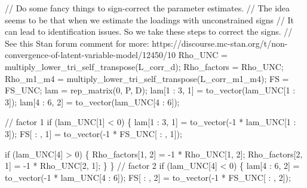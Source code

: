 \documentclass[
  letterpaper,
  DIV=11,
  numbers=noendperiod]{scrreprt}
\newenvironment{Shaded}{\begin{snugshade}}{\end{snugshade}}
\newcommand{\CommentTok}[1]{\textcolor[rgb]{0.37,0.37,0.37}{#1}}
\newcommand{\ControlFlowTok}[1]{\textcolor[rgb]{0.00,0.23,0.31}{#1}}
\newcommand{\DecValTok}[1]{\textcolor[rgb]{0.68,0.00,0.00}{#1}}
\newcommand{\NormalTok}[1]{\textcolor[rgb]{0.00,0.23,0.31}{#1}}
\begin{document}
\begin{Shaded}
\begin{Highlighting}[]
  \CommentTok{// Do some fancy things to sign{-}correct the parameter estimates.}
  \CommentTok{// The idea seems to be that when we estimate the loadings with unconstrained signs}
  \CommentTok{// It can lead to identification issues. So we take these steps to correct the signs.}
  \CommentTok{// See this Stan forum comment for more: https://discourse.mc{-}stan.org/t/non{-}convergence{-}of{-}latent{-}variable{-}model/12450/10}
\NormalTok{  Rho\_UNC = multiply\_lower\_tri\_self\_transpose(L\_corr\_d);}
\NormalTok{  Rho\_factors = Rho\_UNC;}
\NormalTok{  Rho\_m1\_m4 = multiply\_lower\_tri\_self\_transpose(L\_corr\_m1\_m4);}
\NormalTok{  FS = FS\_UNC;}
\NormalTok{  lam = rep\_matrix(}\DecValTok{0}\NormalTok{, P, D);}
\NormalTok{  lam[}\DecValTok{1}\NormalTok{ : }\DecValTok{3}\NormalTok{, }\DecValTok{1}\NormalTok{] = to\_vector(lam\_UNC[}\DecValTok{1}\NormalTok{ : }\DecValTok{3}\NormalTok{]);}
\NormalTok{  lam[}\DecValTok{4}\NormalTok{ : }\DecValTok{6}\NormalTok{, }\DecValTok{2}\NormalTok{] = to\_vector(lam\_UNC[}\DecValTok{4}\NormalTok{ : }\DecValTok{6}\NormalTok{]);}
  
  \CommentTok{// factor 1}
  \ControlFlowTok{if}\NormalTok{ (lam\_UNC[}\DecValTok{1}\NormalTok{] \textless{} }\DecValTok{0}\NormalTok{) \{}
\NormalTok{    lam[}\DecValTok{1}\NormalTok{ : }\DecValTok{3}\NormalTok{, }\DecValTok{1}\NormalTok{] = to\_vector({-}}\DecValTok{1}\NormalTok{ * lam\_UNC[}\DecValTok{1}\NormalTok{ : }\DecValTok{3}\NormalTok{]);}
\NormalTok{    FS[ : , }\DecValTok{1}\NormalTok{] = to\_vector({-}}\DecValTok{1}\NormalTok{ * FS\_UNC[ : , }\DecValTok{1}\NormalTok{]);}
    
    \ControlFlowTok{if}\NormalTok{ (lam\_UNC[}\DecValTok{4}\NormalTok{] \textgreater{} }\DecValTok{0}\NormalTok{) \{}
\NormalTok{      Rho\_factors[}\DecValTok{1}\NormalTok{, }\DecValTok{2}\NormalTok{] = {-}}\DecValTok{1}\NormalTok{ * Rho\_UNC[}\DecValTok{1}\NormalTok{, }\DecValTok{2}\NormalTok{];}
\NormalTok{      Rho\_factors[}\DecValTok{2}\NormalTok{, }\DecValTok{1}\NormalTok{] = {-}}\DecValTok{1}\NormalTok{ * Rho\_UNC[}\DecValTok{2}\NormalTok{, }\DecValTok{1}\NormalTok{];}
\NormalTok{    \}}
\NormalTok{  \}}
  \CommentTok{// factor 2}
  \ControlFlowTok{if}\NormalTok{ (lam\_UNC[}\DecValTok{4}\NormalTok{] \textless{} }\DecValTok{0}\NormalTok{) \{}
\NormalTok{    lam[}\DecValTok{4}\NormalTok{ : }\DecValTok{6}\NormalTok{, }\DecValTok{2}\NormalTok{] = to\_vector({-}}\DecValTok{1}\NormalTok{ * lam\_UNC[}\DecValTok{4}\NormalTok{ : }\DecValTok{6}\NormalTok{]);}
\NormalTok{    FS[ : , }\DecValTok{2}\NormalTok{] = to\_vector({-}}\DecValTok{1}\NormalTok{ * FS\_UNC[ : , }\DecValTok{2}\NormalTok{]);}
    

\end{Highlighting}
\end{Shaded}
\end{document}
